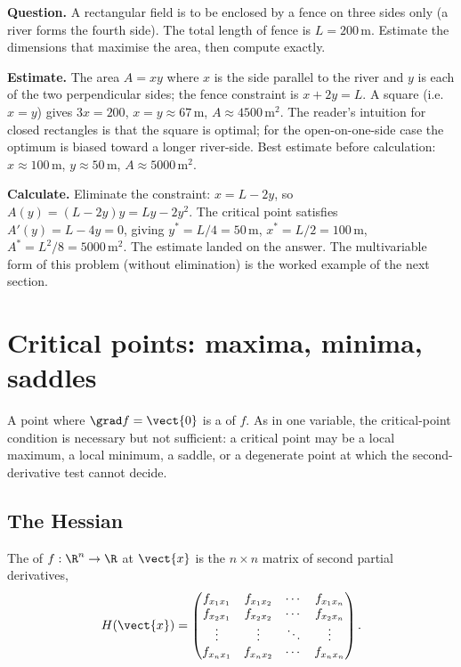 \begin{estimation}
\textbf{Question.} A rectangular field is to be enclosed by a fence
on three sides only (a river forms the fourth side). The total
length of fence is $L = 200\,\si{\meter}$. Estimate the dimensions
that maximise the area, then compute exactly.

\textbf{Estimate.} The area $A = x y$ where $x$ is the side parallel
to the river and $y$ is each of the two perpendicular sides; the
fence constraint is $x + 2 y = L$. A square (i.e.\ $x = y$) gives
$3 x = 200$, $x = y \approx 67\,\si{\meter}$, $A \approx
4500\,\si{\meter\squared}$. The reader's intuition for closed
rectangles is that the square is optimal; for the open-on-one-side
case the optimum is biased toward a longer river-side. Best estimate
before calculation: $x \approx 100\,\si{\meter}$, $y \approx
50\,\si{\meter}$, $A \approx 5000\,\si{\meter\squared}$.

\textbf{Calculate.} Eliminate the constraint: $x = L - 2 y$, so
$A(y) = (L - 2 y) y = L y - 2 y^{2}$. The critical point satisfies
$A'(y) = L - 4 y = 0$, giving $y^{*} = L/4 = 50\,\si{\meter}$,
$x^{*} = L/2 = 100\,\si{\meter}$, $A^{*} = L^{2}/8 =
5000\,\si{\meter\squared}$. The estimate landed on the answer. The
multivariable form of this problem (without elimination) is the
worked example of the next section.
\end{estimation}

\section{Critical points: maxima, minima, saddles}

A point where $\grad f = \vect{0}$ is a  of
$f$. As in one variable, the critical-point condition is necessary
but not sufficient: a critical point may be a local maximum, a
local minimum, a saddle, or a degenerate point at which the second-
derivative test cannot decide.

\subsection{The Hessian}

\begin{definition}[Hessian]
The  of $f : \R^{n} \to \R$ at $\vect{x}$ is the
$n \times n$ matrix of second partial derivatives,
\[
H(\vect{x}) = \begin{pmatrix}
f_{x_{1} x_{1}} & f_{x_{1} x_{2}} & \cdots & f_{x_{1} x_{n}} \\
f_{x_{2} x_{1}} & f_{x_{2} x_{2}} & \cdots & f_{x_{2} x_{n}} \\
\vdots & \vdots & \ddots & \vdots \\
f_{x_{n} x_{1}} & f_{x_{n} x_{2}} & \cdots & f_{x_{n} x_{n}}
\end{pmatrix}.
\]
\end{definition}

